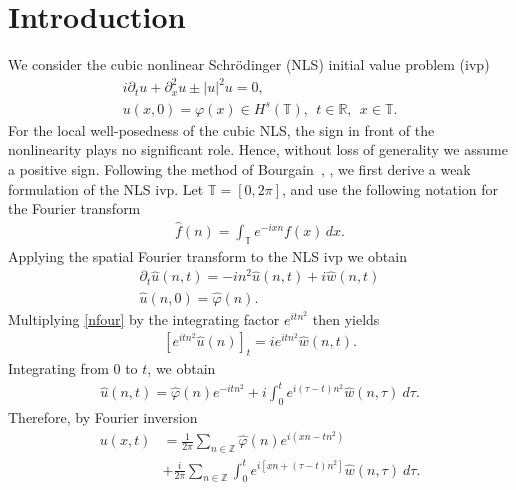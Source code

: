 \documentclass[12pt,reqno]{amsart}
\numberwithin{equation}{section}  %
\newcommand{\rr}{\mathbb{R}}
\newcommand{\zz}{\mathbb{Z}}
\newcommand{\ci}{\mathbb{T}}
\newcommand{\wh}{\widehat}
\newcommand{\p}{\partial}
\newcommand{\vp}{\varphi}
\begin{document}
\section{Introduction}
				  We consider the cubic nonlinear Schr\"{o}dinger (NLS) 
				  initial value problem (ivp)
%
%
\begin{gather}
	\label{nNLS-eq}
	i \p_t u + \p_x^{2} u \pm |u|^2 u =0,
		\\
		\label{nNLS-init-data}
		u(x,0) = \vp(x) \in H^s(\ci), \ \ t \in \rr, \ \ x \in \ci.
\end{gather}
%
%
For the local well-posedness of the cubic NLS,
the sign in front of the nonlinearity plays no significant role.
Hence, without loss of generality we assume a positive sign.
Following the method of Bourgain~\cite{Bourgain-Fourier-transfo-1},
\cite{Bourgain-Fourier-transfo}, we first derive a
weak formulation of the NLS ivp. Let
$\ci = [0, 2 \pi]$, and use
the following notation for the Fourier transform
%
%
%
%
\begin{equation}
	\label{nfour-trans-pde}
	\begin{split}
    \widehat{f}(n) = \int_{\ci} e^{-ix n} f(x) \, dx.
	\end{split}
\end{equation}
Applying the spatial Fourier transform to the NLS ivp we obtain
%
%
\begin{gather}
  \label{nfour}
  \p_t \widehat{u}(n, t) = -i n^2 \widehat{u}(n, t) + i  
  \widehat{w} (n, t)
	\\
  \label{nfour-init-data}
	\widehat{u} (n,0) = \widehat{\vp}(n).
\end{gather}
Multiplying \eqref{nfour} by the integrating factor $e^{itn^2}$ then yields
\begin{equation*}
	\begin{split}
		\left[ e^{ it n^2} \widehat{u}(n) \right]_t = i
		 e^{ it n^2} \widehat{w} (n, t).	
	\end{split}
\end{equation*}
%
%
Integrating from $0$ to $t$, we obtain
%
%
\begin{equation*}
	\begin{split}
		\wh{u}(n, t) = \wh{\vp}(n) e^{- it n^2} + i  
		\int_0^t e^{ i(\tau - t) n^2} \wh{w}(n, \tau) \ 
		d\tau.
	\end{split}
\end{equation*}
%
%
Therefore, by Fourier inversion 
%
%
\begin{equation}
	\label{nNLS-integral-form}
	\begin{split}
		u(x,t) & = \frac{1}{2\pi} \sum_{n \in \zz} \wh{\vp}(n) e^{i\left( xn - t n^2 
		\right)} 
		\\
    & + \frac{i}{2 \pi} \sum_{n \in \zz} \int_0^t e^{i\left[ xn + \left( \tau - t 
		\right) n^2 \right]} \wh{w}(n, \tau) \ d\tau.
	\end{split}
\end{equation}
\end{document}
